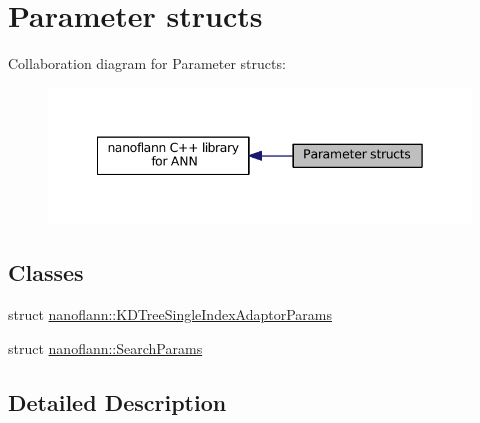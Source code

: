 \hypertarget{group__param__grp}{\section{Parameter structs}
\label{group__param__grp}
}
Collaboration diagram for Parameter structs\-:\nopagebreak
\begin{figure}[H]
\begin{center}
\leavevmode
\includegraphics[width=342pt]{group__param__grp}
\end{center}
\end{figure}
\subsection*{Classes}
\begin{DoxyCompactItemize}
\item 
struct \hyperlink{structnanoflann_1_1_k_d_tree_single_index_adaptor_params}{nanoflann\-::\-K\-D\-Tree\-Single\-Index\-Adaptor\-Params}
\item 
struct \hyperlink{structnanoflann_1_1_search_params}{nanoflann\-::\-Search\-Params}
\end{DoxyCompactItemize}


\subsection{Detailed Description}

